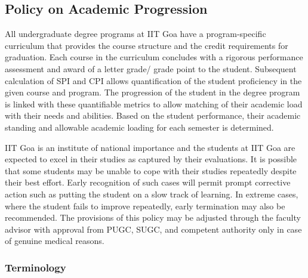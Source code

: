\subsection{Policy on Academic Progression}

All undergraduate degree programs at IIT Goa have a program-specific curriculum that provides the course structure and the credit requirements for graduation. Each course in the curriculum concludes with a rigorous performance assessment and award of a letter grade/ grade point to the student. Subsequent calculation of SPI and CPI allows quantification of the student proficiency in the given course and program. The progression of the student in the degree program is linked with these quantifiable metrics to allow matching of their academic load with their needs and abilities. Based on the student performance, their academic standing and allowable academic loading for each semester is determined. 

IIT Goa is an institute of national importance and the students at IIT Goa are expected to excel in their studies as captured by their evaluations. It is possible that some students may be unable to cope with their studies repeatedly despite their best effort. Early recognition of such cases will permit prompt corrective action such as putting the student on a slow track of learning. In extreme cases, where the student fails to improve repeatedly, early termination may also be recommended. The provisions of this policy may be adjusted through the faculty advisor with approval from PUGC, SUGC, and competent authority only in case of genuine medical reasons.

\subsubsection{Terminology}

